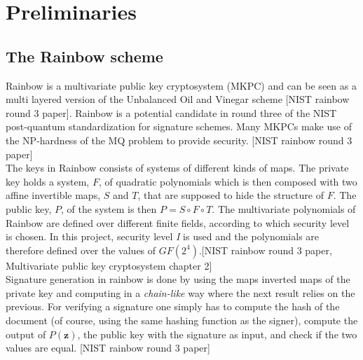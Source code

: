 \section{Preliminaries}
\subsection{The Rainbow scheme}
Rainbow is a multivariate public key cryptosystem (MKPC) and can be seen as a multi layered version of the Unbalanced Oil and Vinegar scheme [NIST rainbow round 3 paper]. Rainbow is a potential candidate in round three of the NIST post-quantum standardization for signature schemes. Many MKPCs make use of the NP-hardness of the MQ problem to provide security. [NIST rainbow round 3 paper]
\medskip\\
The keys in Rainbow consists of systems of different kinds of maps. The private key holds a system, $F$, of quadratic polynomials which is then composed with two affine invertible maps, $S$ and $T$, that are supposed to hide the structure of $F$. The public key, $P$, of the system is then $P = S \circ F \circ T$. The multivariate polynomials of Rainbow are defined over different finite fields, according to which security level is chosen. In this project, security level \textit{I} is used and the polynomials are therefore defined over the values of $GF(2^4)$.[NIST rainbow round 3 paper, Multivariate public key cryptosystem chapter 2]
\medskip\\
Signature generation in rainbow is done by using the maps inverted maps of the private key and computing in a \textit{chain-like} way where the next result relies on the previous. For verifying a signature one simply has to compute the hash of the document (of course, using the same hashing function as the signer), compute the output of $P(\textbf{z})$, the public key with the signature as input, and check if the two values are equal. [NIST rainbow round 3 paper]


